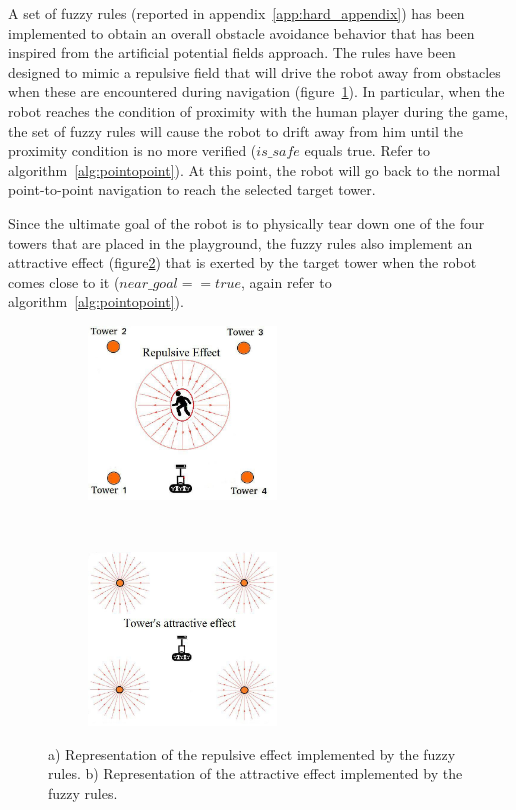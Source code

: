 A set of fuzzy rules (reported in appendix~\ref{app:hard_appendix})	has been implemented to obtain an overall obstacle avoidance behavior that has been inspired from the artificial potential fields approach. The rules have been designed to mimic a repulsive field that will drive the robot away from obstacles when these are encountered during navigation (figure~\ref{avoid1}). In particular, when the robot reaches the condition of proximity with the human player during the game, the set of fuzzy rules will cause the robot to drift away from him until the proximity condition is no more verified ($is\_safe$ equals true. Refer to algorithm~\ref{alg:pointopoint}). At this point, the robot will go back to the normal point-to-point navigation to reach the selected target tower.

Since the ultimate goal of the robot is to physically tear down one of the four towers that are placed in the playground, the fuzzy rules also implement an attractive effect (figure\ref{avoid2}) that is exerted by the target tower when the robot comes close to it  ($near\_goal == true$, again refer to algorithm~\ref{alg:pointopoint}).

\begin{figure}[H]
	\centering
	\begin{subfigure}[b]{0.4\textwidth}
		\includegraphics[width=5cm]{images/03-foundation/avoid1}
		\caption{}
		\label{avoid1} 
	\end{subfigure}
    ~
	\begin{subfigure}[b]{0.4\textwidth}
		\includegraphics[width=5cm]{images/03-foundation/avoid2}
		\caption{}
		\label{avoid2}
	\end{subfigure}
	\caption{a) Representation of the repulsive effect implemented by the fuzzy rules. b) Representation of the attractive effect implemented by the fuzzy rules. }
	\label{rulesbehavior}
\end{figure}


